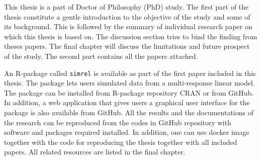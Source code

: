 This thesis is a part of Doctor of Philosophy (PhD) study. The first
part of the thesis constitute a gentle introduction to the objective of
the study and some of its background. This is followed by the summary of
individual research paper on which this thesis is based on. The
discussion section tries to bind the finding from theses papers. The
final chapter will discuss the limitations and future prospect of the
study. The second part contains all the papers attached.

An R-package called \texttt{simrel} is available as part of the first
paper included in this thesis. The package lets users simulated data
from a multi-response linear model. The package can be installed from
R-package repository CRAN or from GitHub. In addition, a web application
that gives users a graphical user interface for the package is also
available from GitHub. All the results and the documentations of the
research can be reproduced from the codes in GitHub repository with
software and packages required installed. In addition, one can use
docker image together with the code for reproducing the thesis together
with all included papers. All related resources are listed in the final
chapter.
